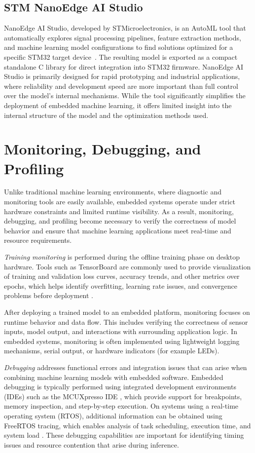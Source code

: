 \subsection{STM NanoEdge AI Studio}
NanoEdge AI Studio, developed by STMicroelectronics, is an AutoML tool that automatically explores signal processing pipelines, feature extraction methods, and machine learning model configurations to find solutions optimized for a specific STM32 target device~\cite{nanoedge}. The resulting model is exported as a compact standalone C library for direct integration into STM32 firmware. 
NanoEdge AI Studio is primarily designed for rapid prototyping and industrial applications, where reliability and development speed are more important than full control over the model's internal mechanisms. While the tool significantly simplifies the deployment of embedded machine learning, it offers limited insight into the internal structure of the model and the optimization methods used.

\section{Monitoring, Debugging, and Profiling}
Unlike traditional machine learning environments, where diagnostic and monitoring tools are easily available, embedded systems operate under strict hardware constraints and limited runtime visibility. As a result, monitoring, debugging, and profiling become necessary to verify the correctness of model behavior and ensure that machine learning applications meet real-time and resource requirements.

\emph{Training monitoring} is performed during the offline training phase on desktop hardware. Tools such as TensorBoard are commonly used to provide visualization of training and validation loss curves, accuracy trends, and other metrics over epochs, which helps identify overfitting, learning rate issues, and convergence problems before deployment \cite{tensorboard}.

After deploying a trained model to an embedded platform, monitoring focuses on runtime behavior and data flow. This includes verifying the correctness of sensor inputs, model output, and interactions with surrounding application logic. In embedded systems, monitoring is often implemented using lightweight logging mechanisms, serial output, or hardware indicators (for example LEDs). 

\emph{Debugging} addresses functional errors and integration issues that can arise when combining machine learning models with embedded software. Embedded debugging is typically performed using integrated development environments (IDEs) such as the MCUXpresso IDE \cite{mcuxpressoide}, which provide support for breakpoints, memory inspection, and step-by-step execution. On systems using a real-time operating system (RTOS), additional information can be obtained using FreeRTOS tracing, which enables analysis of task scheduling, execution time, and system load \cite{freertostrace}. These debugging capabilities are important for identifying timing issues and resource contention that arise during inference.


